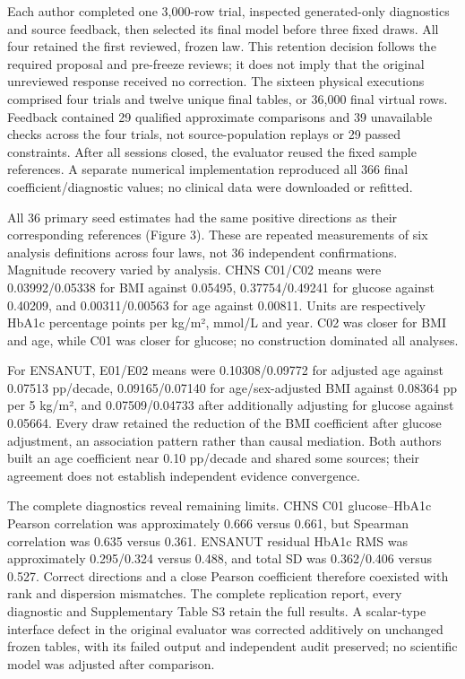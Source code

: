 \documentclass[11pt,letterpaper]{article}
\begin{document}
Each author completed one 3,000-row trial, inspected generated-only diagnostics and source feedback, then selected its final model before three fixed draws. All four retained the first reviewed, frozen law. This retention decision follows the required proposal and pre-freeze reviews; it does not imply that the original unreviewed response received no correction. The sixteen physical executions comprised four trials and twelve unique final tables, or 36,000 final virtual rows. Feedback contained 29 qualified approximate comparisons and 39 unavailable checks across the four trials, not source-population replays or 29 passed constraints. After all sessions closed, the evaluator reused the fixed sample references. A separate numerical implementation reproduced all 366 final coefficient/\allowbreak{}diagnostic values; no clinical data were downloaded or refitted.


All 36 primary seed estimates had the same positive directions as their corresponding references (Figure 3). These are repeated measurements of six analysis definitions across four laws, not 36 independent confirmations. Magnitude recovery varied by analysis. CHNS C01/\allowbreak{}C02 means were 0.03992/\allowbreak{}0.05338 for BMI against 0.05495, 0.37754/\allowbreak{}0.49241 for glucose against 0.40209, and 0.00311/\allowbreak{}0.00563 for age against 0.00811. Units are respectively HbA1c percentage points per kg/\allowbreak{}m², mmol/\allowbreak{}L and year. C02 was closer for BMI and age, while C01 was closer for glucose; no construction dominated all analyses.


For ENSANUT, E01/\allowbreak{}E02 means were 0.10308/\allowbreak{}0.09772 for adjusted age against 0.07513 pp/\allowbreak{}decade, 0.09165/\allowbreak{}0.07140 for age/\allowbreak{}sex-adjusted BMI against 0.08364 pp per 5 kg/\allowbreak{}m², and 0.07509/\allowbreak{}0.04733 after additionally adjusting for glucose against 0.05664. Every draw retained the reduction of the BMI coefficient after glucose adjustment, an association pattern rather than causal mediation. Both authors built an age coefficient near 0.10 pp/\allowbreak{}decade and shared some sources; their agreement does not establish independent evidence convergence.


The complete diagnostics reveal remaining limits. CHNS C01 glucose–\allowbreak{}HbA1c Pearson correlation was approximately 0.666 versus 0.661, but Spearman correlation was 0.635 versus 0.361. ENSANUT residual HbA1c RMS was approximately 0.295/\allowbreak{}0.324 versus 0.488, and total SD was 0.362/\allowbreak{}0.406 versus 0.527. Correct directions and a close Pearson coefficient therefore coexisted with rank and dispersion mismatches. The complete replication report, every diagnostic and Supplementary Table S3 retain the full results. A scalar-type interface defect in the original evaluator was corrected additively on unchanged frozen tables, with its failed output and independent audit preserved; no scientific model was adjusted after comparison.
\end{document}
